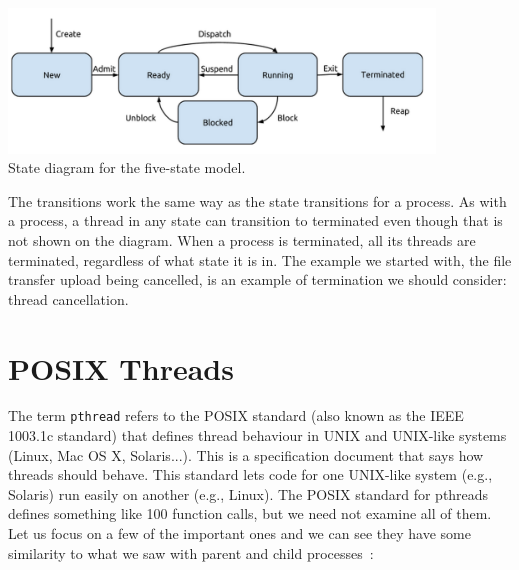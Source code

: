 \documentclass[a4paper]{report}
\begin{document}
\begin{center}
	\includegraphics[width=0.85\textwidth]{images/5-state-model.png}\\
	State diagram for the five-state model.
\end{center}

The transitions work the same way as the state transitions for a process. As with a process, a thread in any state can transition to terminated even though that is not shown on the diagram. When a process is terminated, all its threads are terminated, regardless of what state it is in. The example we started with, the file transfer upload being cancelled, is an example of termination we should consider: thread cancellation.


\section*{POSIX Threads}

The term \texttt{pthread} refers to the POSIX standard (also known as the IEEE 1003.1c standard) that defines thread behaviour in UNIX and UNIX-like systems (Linux, Mac OS X, Solaris...). This is a specification document that says how threads should behave. This standard lets code for one UNIX-like system (e.g., Solaris) run easily on another (e.g., Linux). The POSIX standard for pthreads defines something like 100 function calls, but we need not examine all of them. Let us focus on a few of the important ones and we can see they have some similarity to what we saw with parent and child processes~\cite{mos}:
\end{document}

